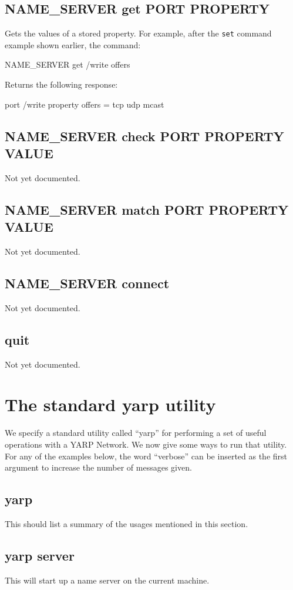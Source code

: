 \documentclass[a4]{article}
\newenvironment{codecase}[1]{\subsection{#1}}{}
\begin{document}
\begin{codecase}{NAME\_SERVER get PORT PROPERTY}
Gets the values of a stored property. For example, 
after the {\tt set} command example shown earlier, the command:
\begin{code}
NAME_SERVER get /write offers
\end{code}
Returns the following response:
\begin{code}
port /write property offers = tcp udp mcast
\end{code}
\end{codecase}

\begin{codecase}{NAME\_SERVER check PORT PROPERTY VALUE}
Not yet documented.
\end{codecase}

\begin{codecase}{NAME\_SERVER match PORT PROPERTY VALUE}
Not yet documented.
\end{codecase}

\begin{codecase}{NAME\_SERVER connect}
Not yet documented.
\end{codecase}

\begin{codecase}{quit}
Not yet documented.
\end{codecase}


\section{The standard yarp utility}

We specify a standard utility called ``yarp'' for performing a set of
useful operations with a YARP Network.  We now give some ways to run that 
utility.  For any of the examples below, the word ``verbose'' can 
be inserted as the first argument to increase the number of 
messages given.

\subsection{yarp}

This should list a summary of the usages mentioned in this section.

\subsection{yarp server}

This will start up a name server on the current machine.
\end{document}
